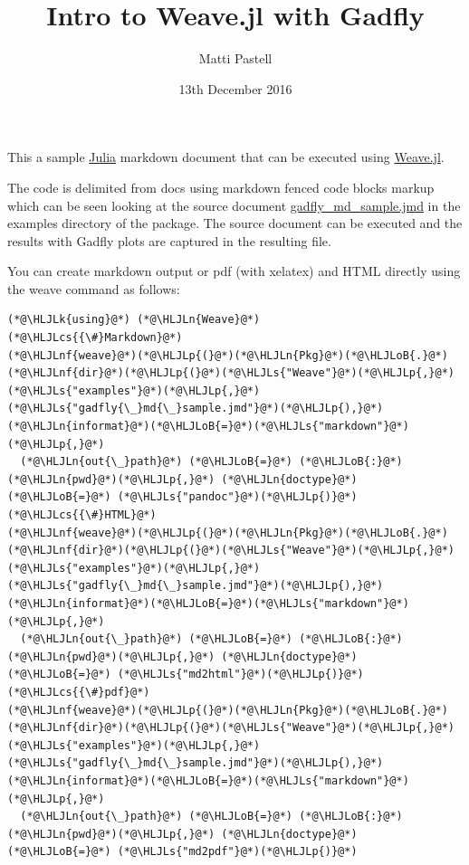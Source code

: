 \documentclass[12pt,a4paper]{article}
\title{ Intro to Weave.jl with Gadfly }
\author{ Matti Pastell }
\date{ 13th December 2016 }
\newcommand{\HLJLk}[1]{\textcolor[RGB]{148,91,176}{\textbf{#1}}}
\newcommand{\HLJLn}[1]{#1}
\newcommand{\HLJLnf}[1]{\textcolor[RGB]{66,102,213}{#1}}
\newcommand{\HLJLs}[1]{\textcolor[RGB]{201,61,57}{#1}}
\newcommand{\HLJLoB}[1]{\textcolor[RGB]{102,102,102}{\textbf{#1}}}
\newcommand{\HLJLp}[1]{#1}
\newcommand{\HLJLcs}[1]{\textcolor[RGB]{153,153,119}{\textit{#1}}}
\begin{document}
\maketitle


This a sample \href{http://julialang.org/}{Julia} markdown document that can be executed using \href{https://github.com/mpastell/Weave.jl}{Weave.jl}.

The code is delimited from docs using markdown fenced code blocks markup which can be seen looking at the source document \href{gadfly_md_sample.jmd}{gadfly\_md\_sample.jmd} in the examples directory of the package. The source document can be executed and the results with Gadfly plots are captured in the resulting file.

You can create markdown output or pdf (with xelatex) and HTML directly using the weave command as follows:

\begin{lstlisting}
(*@\HLJLk{using}@*) (*@\HLJLn{Weave}@*)
(*@\HLJLcs{{\#}Markdown}@*)
(*@\HLJLnf{weave}@*)(*@\HLJLp{(}@*)(*@\HLJLn{Pkg}@*)(*@\HLJLoB{.}@*)(*@\HLJLnf{dir}@*)(*@\HLJLp{(}@*)(*@\HLJLs{"Weave"}@*)(*@\HLJLp{,}@*)(*@\HLJLs{"examples"}@*)(*@\HLJLp{,}@*)(*@\HLJLs{"gadfly{\_}md{\_}sample.jmd"}@*)(*@\HLJLp{),}@*) (*@\HLJLn{informat}@*)(*@\HLJLoB{=}@*)(*@\HLJLs{"markdown"}@*)(*@\HLJLp{,}@*)
  (*@\HLJLn{out{\_}path}@*) (*@\HLJLoB{=}@*) (*@\HLJLoB{:}@*)(*@\HLJLn{pwd}@*)(*@\HLJLp{,}@*) (*@\HLJLn{doctype}@*) (*@\HLJLoB{=}@*) (*@\HLJLs{"pandoc"}@*)(*@\HLJLp{)}@*)
(*@\HLJLcs{{\#}HTML}@*)
(*@\HLJLnf{weave}@*)(*@\HLJLp{(}@*)(*@\HLJLn{Pkg}@*)(*@\HLJLoB{.}@*)(*@\HLJLnf{dir}@*)(*@\HLJLp{(}@*)(*@\HLJLs{"Weave"}@*)(*@\HLJLp{,}@*)(*@\HLJLs{"examples"}@*)(*@\HLJLp{,}@*)(*@\HLJLs{"gadfly{\_}md{\_}sample.jmd"}@*)(*@\HLJLp{),}@*) (*@\HLJLn{informat}@*)(*@\HLJLoB{=}@*)(*@\HLJLs{"markdown"}@*)(*@\HLJLp{,}@*)
  (*@\HLJLn{out{\_}path}@*) (*@\HLJLoB{=}@*) (*@\HLJLoB{:}@*)(*@\HLJLn{pwd}@*)(*@\HLJLp{,}@*) (*@\HLJLn{doctype}@*) (*@\HLJLoB{=}@*) (*@\HLJLs{"md2html"}@*)(*@\HLJLp{)}@*)
(*@\HLJLcs{{\#}pdf}@*)
(*@\HLJLnf{weave}@*)(*@\HLJLp{(}@*)(*@\HLJLn{Pkg}@*)(*@\HLJLoB{.}@*)(*@\HLJLnf{dir}@*)(*@\HLJLp{(}@*)(*@\HLJLs{"Weave"}@*)(*@\HLJLp{,}@*)(*@\HLJLs{"examples"}@*)(*@\HLJLp{,}@*)(*@\HLJLs{"gadfly{\_}md{\_}sample.jmd"}@*)(*@\HLJLp{),}@*) (*@\HLJLn{informat}@*)(*@\HLJLoB{=}@*)(*@\HLJLs{"markdown"}@*)(*@\HLJLp{,}@*)
  (*@\HLJLn{out{\_}path}@*) (*@\HLJLoB{=}@*) (*@\HLJLoB{:}@*)(*@\HLJLn{pwd}@*)(*@\HLJLp{,}@*) (*@\HLJLn{doctype}@*) (*@\HLJLoB{=}@*) (*@\HLJLs{"md2pdf"}@*)(*@\HLJLp{)}@*)
\end{lstlisting}
\end{document}
